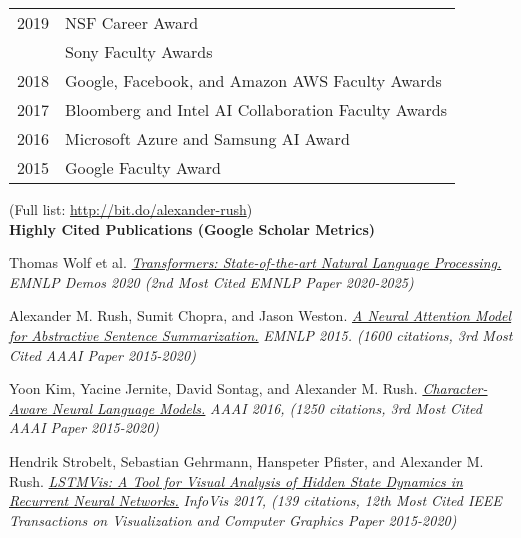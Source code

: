 \documentclass[10pt]{article}
\begin{document}

\hspace{-1cm} \begin{tabular}{lp{11.5cm}}
	2019 & NSF Career Award                                    \\
	     & Sony Faculty Awards                                 \\
	2018 & Google, Facebook, and Amazon AWS Faculty Awards     \\
	2017 & Bloomberg and Intel AI Collaboration Faculty Awards \\
	2016 & Microsoft Azure  and Samsung AI Award               \\
	2015 & Google Faculty Award                                \\
\end{tabular}
\pagebreak


\bigskip



\noindent (Full list: \url{http://bit.do/alexander-rush}) \\

\medskip
\noindent
\textbf{Highly Cited Publications (Google Scholar Metrics)}

\ind  Thomas Wolf et al. \emph{\href{ https://arxiv.org/pdf/1910.03771 }{ Transformers: State-of-the-art Natural Language Processing.} }\emph{ EMNLP Demos 2020 (2nd Most Cited EMNLP Paper 2020-2025) }

\medskip

\ind Alexander M. Rush, Sumit Chopra, and Jason Weston. \emph{\href{ http://arxiv.org/pdf/1509.00685.pdf }{ A Neural Attention Model for Abstractive Sentence Summarization.} }\emph{ EMNLP 2015. (1600 citations, 3rd Most Cited AAAI Paper 2015-2020) }

\medskip


\ind Yoon Kim, Yacine Jernite, David Sontag, and Alexander M. Rush. \emph{\href{ https://arxiv.org/pdf/1508.06615v4 }{ Character-Aware Neural Language Models.} }\emph{ AAAI 2016, (1250 citations, 3rd Most Cited AAAI Paper 2015-2020) }

\medskip

\ind Hendrik Strobelt, Sebastian Gehrmann, Hanspeter Pfister, and Alexander M. Rush. \emph{\href{ http://lstm.seas.harvard.edu/ }{ LSTMVis: A Tool for Visual Analysis of Hidden State Dynamics in Recurrent Neural Networks.} }\emph{ InfoVis 2017, (139 citations, 12th Most Cited IEEE Transactions on Visualization and Computer Graphics Paper 2015-2020) }
\end{document}
